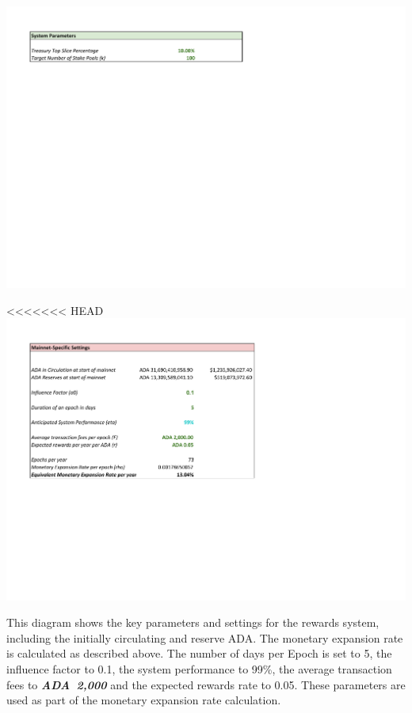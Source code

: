 \documentclass[11pt,a4paper,dvipsnames,twosided,final]{article}
\newcommand{\ada}{ADA{}}
\newcommand{\ADA}[1]{\textbf{\emph{\ada~{#1}}}}
\begin{document}
\hspace{-0.65in}\begin{minipage}{\textwidth}
\noindent\includegraphics{RCM0.pdf}
\vspace{-7in}

<<<<<<< HEAD
\noindent\includegraphics{RCM1.pdf}
\vspace{-3in}
\end{minipage}

\noindent
This diagram shows the key parameters and settings for the rewards system, including the initially
circulating and reserve \ada{}.  The monetary expansion rate is calculated as described above.
The number of days per Epoch is set to 5, the influence factor to 0.1, the system performance
to 99\%, the average transaction fees to \ADA{2,000} and the expected rewards rate to 0.05.
These parameters are used as part of the monetary expansion rate calculation.
\end{document}
